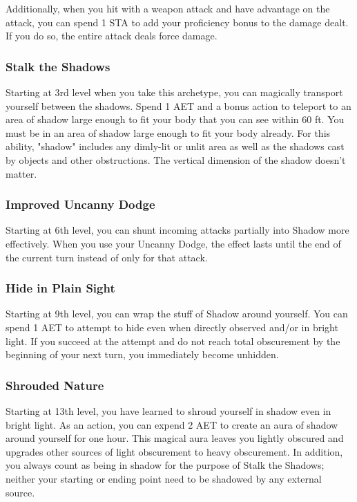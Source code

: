 Additionally, when you hit with a weapon attack and have advantage on the attack, you can spend 1 STA to add your proficiency bonus to the damage dealt. If you do so, the entire attack deals force damage.

\subsubsection{Stalk the Shadows}
Starting at 3rd level when you take this archetype, you can magically transport yourself between the shadows. Spend 1 AET and a bonus action to teleport to an area of shadow large enough to fit your body that you can see within 60 ft. You must be in an area of shadow large enough to fit your body already. For this ability, "shadow" includes any dimly-lit or unlit area as well as the shadows cast by objects and other obstructions. The vertical dimension of the shadow doesn't matter.

\subsubsection{Improved Uncanny Dodge}
Starting at 6th level, you can shunt incoming attacks partially into Shadow more effectively. When you use your Uncanny Dodge, the effect lasts until the end of the current turn instead of only for that attack.

\subsubsection{Hide in Plain Sight}
Starting at 9th level, you can wrap the stuff of Shadow around yourself. You can spend 1 AET to attempt to hide even when directly observed and/or in bright light. If you succeed at the attempt and do not reach total obscurement by the beginning of your next turn, you immediately become unhidden.

\subsubsection{Shrouded Nature}
Starting at 13th level, you have learned to shroud yourself in shadow even in bright light. As an action, you can expend 2 AET to create an aura of shadow around yourself for one hour. This magical aura leaves you lightly obscured and upgrades other sources of light obscurement to heavy obscurement. In addition, you always count as being in shadow for the purpose of Stalk the Shadows; neither your starting or ending point need to be shadowed by any external source.  

